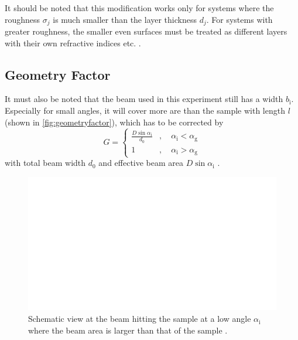 It should be noted that this modification works only for systems where the roughness $\sigma_j$ is much smaller than the layer thickness $d_j$.
For systems with greater roughness, the smaller even surfaces must be treated as different layers with their own refractive indices etc. \cite{tolan}.

\subsection{Geometry Factor}

It must also be noted that the beam used in this experiment still has a width $b_\text{i}$.
Especially for small angles, it will cover more are than the sample with length $l$ (shown in \autoref{fig:geometryfactor}), 
which has to be corrected by
\begin{equation}
    G = \begin{cases}
        \frac{D \sin\alpha_\text{i}}{d_0}&, \quad \alpha_ \text{i} < \alpha_\text{g} \\
        1&,\quad \alpha_\text{i} > \alpha_\text{g}
    \end{cases}
    \label{eq:GeometryFactor}
\end{equation}
with total beam width $d_0$ and effective beam area $D \sin\alpha_\text{i}$ \cite{v44}.

\begin{figure}[H]
    \centering
    \includegraphics{figures/beam_width.pdf}
    \caption{Schematic view at the beam hitting the sample at a low angle $\alpha_\text{i}$ where the beam area is larger than that of the sample \cite{v44}.}
    \label{fig:geometryfactor}
\end{figure}




